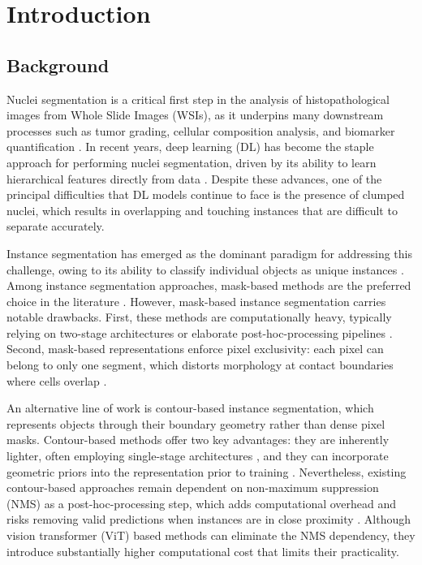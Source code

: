 \chapter{Introduction}

\section{Background}

Nuclei segmentation is a critical first step in the analysis of histopathological images from Whole Slide Images (WSIs), as it underpins many downstream processes such as tumor grading, cellular composition analysis, and biomarker quantification \cite{basu2023survey}. In recent years, deep learning (DL) has become the staple approach for performing nuclei segmentation, driven by its ability to learn hierarchical features directly from data \cite{basu2023survey,deng2020deep}. Despite these advances, one of the principal difficulties that DL models continue to face is the presence of clumped nuclei, which results in overlapping and touching instances that are difficult to separate accurately.

Instance segmentation has emerged as the dominant paradigm for addressing this challenge, owing to its ability to classify individual objects as unique instances \cite{shephard2021simultaneous}. Among instance segmentation approaches, mask-based methods are the preferred choice in the literature \cite{nunes2025survey}. However, mask-based instance segmentation carries notable drawbacks. First, these methods are computationally heavy, typically relying on two-stage architectures or elaborate post-hoc-processing pipelines \cite{zhang2020mask}. Second, mask-based representations enforce pixel exclusivity: each pixel can belong to only one segment, which distorts morphology at contact boundaries where cells overlap \cite{eppel2020computer}.

An alternative line of work is contour-based instance segmentation, which represents objects through their boundary geometry rather than dense pixel masks. Contour-based methods offer two key advantages: they are inherently lighter, often employing single-stage architectures \cite{zhang2020mask}, and they can incorporate geometric priors into the representation prior to training \cite{xie2019polarmask}. Nevertheless, existing contour-based approaches remain dependent on non-maximum suppression (NMS) as a post-hoc-processing step, which adds computational overhead and risks removing valid predictions when instances are in close proximity \cite{schmidt2018cell}. Although vision transformer (ViT) based methods can eliminate the NMS dependency, they introduce substantially higher computational cost that limits their practicality.

